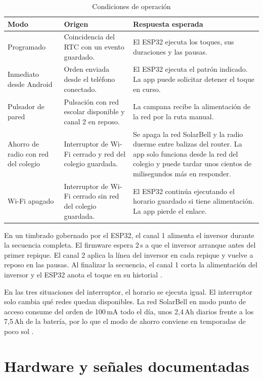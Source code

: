 \documentclass[a4paper,11pt]{article}
\begin{document}
\begin{table}[H]
\centering\small
\caption{Condiciones de operación}
\begin{tabularx}{\linewidth}{@{}P{3.4cm}YY@{}}
\toprule
\textbf{Modo} & \textbf{Origen} & \textbf{Respuesta esperada} \\
\midrule
Programado & Coincidencia del RTC con un evento guardado. & El ESP32 ejecuta los toques, sus duraciones y las pausas. \\
Inmediato desde Android & Orden enviada desde el teléfono conectado. & El ESP32 ejecuta el patrón indicado. La app puede solicitar detener el toque en curso. \\
Pulsador de pared & Pulsación con red escolar disponible y canal 2 en reposo. & La campana recibe la alimentación de la red por la ruta manual. \\
Ahorro de radio con red del colegio & Interruptor de Wi-Fi cerrado y red del colegio guardada. & Se apaga la red SolarBell y la radio duerme entre balizas del router. La app solo funciona desde la red del colegio y puede tardar unos cientos de milisegundos más en responder. \\
Wi-Fi apagado & Interruptor de Wi-Fi cerrado sin red del colegio guardada. & El ESP32 continúa ejecutando el horario guardado si tiene alimentación. La app pierde el enlace. \\
\bottomrule
\end{tabularx}
\end{table}

En un timbrado gobernado por el ESP32, el canal 1 alimenta el inversor durante la secuencia completa. El firmware espera 2\,s a que el inversor arranque antes del primer repique. El canal 2 aplica la línea del inversor en cada repique y vuelve a reposo en las pausas. Al finalizar la secuencia, el canal 1 corta la alimentación del inversor y el ESP32 anota el toque en su historial \cite{fichas,diagrama,repo}.

En las tres situaciones del interruptor, el horario se ejecuta igual. El interruptor solo cambia qué redes quedan disponibles. La red SolarBell en modo punto de acceso consume del orden de 100\,mA todo el día, unos 2,4\,Ah diarios frente a los 7,5\,Ah de la batería, por lo que el modo de ahorro conviene en temporadas de poco sol \cite{repo}.

\clearpage
\section{Hardware y señales documentadas}
\label{sec:hardware}
\end{document}
